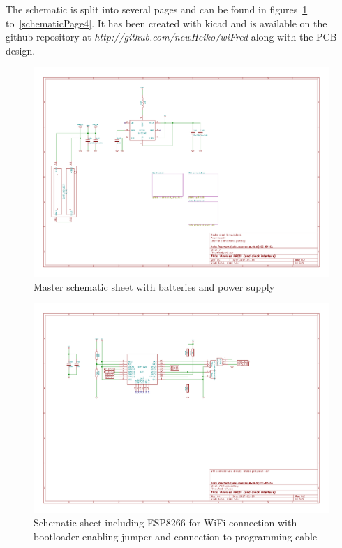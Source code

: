 \documentclass[11pt,a4paper]{scrartcl}
\begin{document}
The schematic is split into several pages and can be found in figures~\ref{schematicPage1} to~\ref{schematicPage4}. It has been created with kicad and is available on the github repository at \textit{http://github.com/newHeiko/wiFred} along with the PCB design.

\begin{figure}[tbh]
  \centering
  \includegraphics[width=\textwidth]{images/wfred_rev2}
  \caption{Master schematic sheet with batteries and power supply}
  \label{schematicPage1}
\end{figure}

\begin{figure}[tbh]
  \centering
  \includegraphics[width=\textwidth]{images/wfred-wifi-Wifi_connection}
  \caption{Schematic sheet including ESP8266 for WiFi connection with bootloader enabling jumper and connection to programming cable}
  \label{schematicPage2}
\end{figure}
\end{document}
